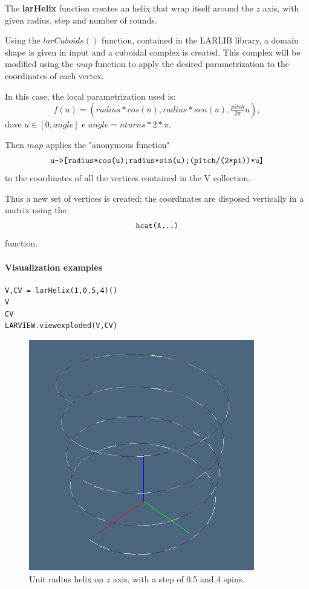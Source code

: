 \documentclass{article}
\begin{document}
The \textbf{larHelix} function creates an helix that wrap itself around the $z$ axis, with given radius, step and number of rounds.

Using the $larCuboids()$ function, contained in the LARLIB library, a domain shape is given in input and a cuboidal complex is created. This complex will be modified using the $map$ function to apply the desired parametrization to the coordinates of each vertex.

In this case, the local parametrization used is:
$$f(u)=(radius*cos(u),radius*sen(u),\tfrac{pitch}{2\pi}u),$$
dove $u \in [0,angle]$ e $angle=nturns*2*\pi$.

Then $map$ applies the "anonymous function"
$$\verb!u->[radius*cos(u);radius*sin(u);(pitch/(2*pi))*u]!$$ to the coordinates of all the vertices contained in the V collection.

Thus a new set of vertices is created; the coordinates are disposed vertically in a matrix using the $$\verb!hcat(A...)!$$ function.
\paragraph{Visualization examples}

\begin{verbatim}
V,CV = larHelix(1,0.5,4)()
V
CV
LARVIEW.viewexploded(V,CV)
\end{verbatim}

\begin{figure}[htbp] 
\centering 
\includegraphics[scale=.43]{larHelix.png}
\caption{Unit radius helix on $z$ axis, with a step of 0.5 and 4 spins.} 
\end{figure}
\end{document}
